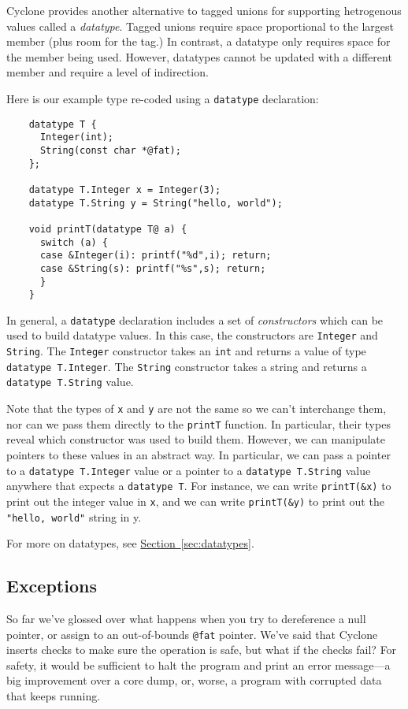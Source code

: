 Cyclone provides another alternative to tagged unions for supporting
hetrogenous values called a \emph{datatype}.  Tagged
unions require space proportional to the largest member (plus room
for the tag.)  In contrast, a datatype only requires space for the
member being used.  However, datatypes cannot be updated with a
different member and require a level of indirection. 

Here is our example type re-coded using a \texttt{datatype} declaration:
\begin{verbatim}
    datatype T {
      Integer(int);
      String(const char *@fat);
    };

    datatype T.Integer x = Integer(3);
    datatype T.String y = String("hello, world");

    void printT(datatype T@ a) {
      switch (a) {
      case &Integer(i): printf("%d",i); return;
      case &String(s): printf("%s",s); return;
      }
    }
\end{verbatim}
In general, a \texttt{datatype} declaration includes a set of
\emph{constructors} which can be used to build datatype values.
In this case, the constructors are \texttt{Integer} and \texttt{String}.
The \texttt{Integer} constructor takes an \texttt{int} and returns
a value of type \texttt{datatype T.Integer}.  The \texttt{String}
constructor takes a string and returns a \texttt{datatype T.String}
value.  

Note that the types of \texttt{x} and \texttt{y} are not 
the same so we can't interchange them, nor can we pass them
directly to the \texttt{printT} function.  In particular,
their types reveal which constructor was used to build
them.  However, we can manipulate pointers to these values
in an abstract way.  In particular, 
we can pass a pointer to a \texttt{datatype T.Integer} value
or a pointer to a \texttt{datatype T.String} value 
anywhere that expects a \texttt{datatype T}.  For instance,
we can write \texttt{printT(\&x)} to print out the integer 
value in \texttt{x}, and we can write \texttt{printT(\&y)}
to print out the \texttt{"hello, world"} string in y.

For more on datatypes, see
\hyperref[{sec:datatypes}]{Section~\ref{sec:datatypes}}.

\subsection{Exceptions}

So far we've glossed over what happens when you try to dereference a
null pointer, or assign to an out-of-bounds \texttt{@fat} pointer.
We've said that Cyclone inserts checks to make sure the operation is
safe, but what if the checks fail?  For safety, it would be sufficient
to halt the program and print an error message---a big improvement
over a core dump, or, worse, a program with corrupted data that keeps
running.

